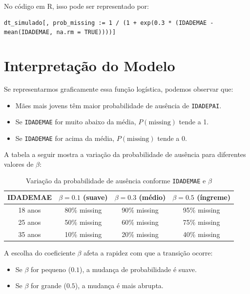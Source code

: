 \documentclass{article}
\begin{document}
No código em R, isso pode ser representado por:

\begin{verbatim}
dt_simulado[, prob_missing := 1 / (1 + exp(0.3 * (IDADEMAE - mean(IDADEMAE, na.rm = TRUE))))]
\end{verbatim}

\section{Interpretação do Modelo}

Se representarmos graficamente essa função logística, podemos observar que:

\begin{itemize}
    \item Mães mais jovens têm maior probabilidade de ausência de \texttt{IDADEPAI}.
    \item Se \texttt{IDADEMAE} for muito abaixo da média, \( P(\text{missing}) \) tende a 1.
    \item Se \texttt{IDADEMAE} for acima da média, \( P(\text{missing}) \) tende a 0.
\end{itemize}

A tabela a seguir mostra a variação da probabilidade de ausência para diferentes valores de \(\beta\):

\begin{table}[h]
    \centering
    \begin{tabular}{|c|c|c|c|}
        \hline
        \textbf{IDADEMAE}  & \(\beta = 0.1\) (suave) & \(\beta = 0.3\) (médio) & \(\beta = 0.5\) (íngreme) \\
        \hline
        18 anos  & 80\% missing  & 90\% missing  & 95\% missing  \\
        25 anos  & 50\% missing  & 60\% missing  & 75\% missing  \\
        35 anos  & 10\% missing  & 20\% missing  & 40\% missing  \\
        \hline
    \end{tabular}
    \caption{Variação da probabilidade de ausência conforme \texttt{IDADEMAE} e \(\beta\)}
\end{table}

A escolha do coeficiente \(\beta\) afeta a rapidez com que a transição ocorre:

\begin{itemize}
    \item Se \(\beta\) for pequeno (\(0.1\)), a mudança de probabilidade é suave.
    \item Se \(\beta\) for grande (\(0.5\)), a mudança é mais abrupta.
\end{itemize}
\end{document}
